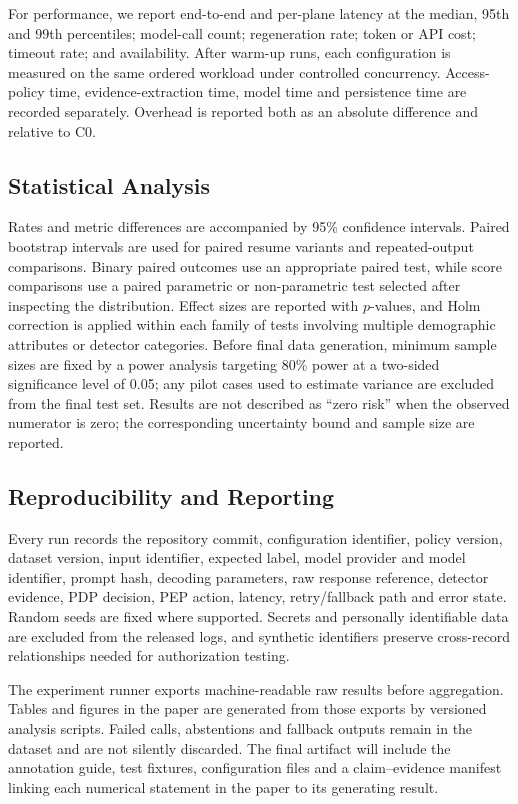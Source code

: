 \documentclass[conference]{IEEEtran}
\begin{document}
For performance, we report end-to-end and per-plane latency at the median, 95th and 99th percentiles; model-call count; regeneration rate; token or API cost; timeout rate; and availability. After warm-up runs, each configuration is measured on the same ordered workload under controlled concurrency. Access-policy time, evidence-extraction time, model time and persistence time are recorded separately. Overhead is reported both as an absolute difference and relative to C0.

\subsection{Statistical Analysis}

Rates and metric differences are accompanied by 95\% confidence intervals. Paired bootstrap intervals are used for paired resume variants and repeated-output comparisons. Binary paired outcomes use an appropriate paired test, while score comparisons use a paired parametric or non-parametric test selected after inspecting the distribution. Effect sizes are reported with $p$-values, and Holm correction is applied within each family of tests involving multiple demographic attributes or detector categories. Before final data generation, minimum sample sizes are fixed by a power analysis targeting 80\% power at a two-sided significance level of 0.05; any pilot cases used to estimate variance are excluded from the final test set. Results are not described as ``zero risk'' when the observed numerator is zero; the corresponding uncertainty bound and sample size are reported.

\subsection{Reproducibility and Reporting}

Every run records the repository commit, configuration identifier, policy version, dataset version, input identifier, expected label, model provider and model identifier, prompt hash, decoding parameters, raw response reference, detector evidence, PDP decision, PEP action, latency, retry/fallback path and error state. Random seeds are fixed where supported. Secrets and personally identifiable data are excluded from the released logs, and synthetic identifiers preserve cross-record relationships needed for authorization testing.

The experiment runner exports machine-readable raw results before aggregation. Tables and figures in the paper are generated from those exports by versioned analysis scripts. Failed calls, abstentions and fallback outputs remain in the dataset and are not silently discarded. The final artifact will include the annotation guide, test fixtures, configuration files and a claim--evidence manifest linking each numerical statement in the paper to its generating result.
\end{document}
